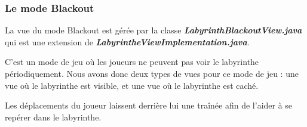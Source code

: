 \subsubsection*{Le mode Blackout}

La vue du mode Blackout est gérée par la classe \textbf{\textit{LabyrinthBlackoutView.java}} qui est une extension de \textbf{\textit{LabyrintheViewImplementation.java}}.

C'est un mode de jeu où les joueurs ne peuvent pas voir le labyrinthe périodiquement. Nous avons donc deux types de vues pour ce mode de jeu : une vue où le labyrinthe est visible, et une vue où le labyrinthe est caché.

Les déplacements du joueur laissent derrière lui une traînée afin de l'aider à se repérer dans le labyrinthe.

\begin{figure}[!htb]%
    \centering
    \qquad

\end{figure}
